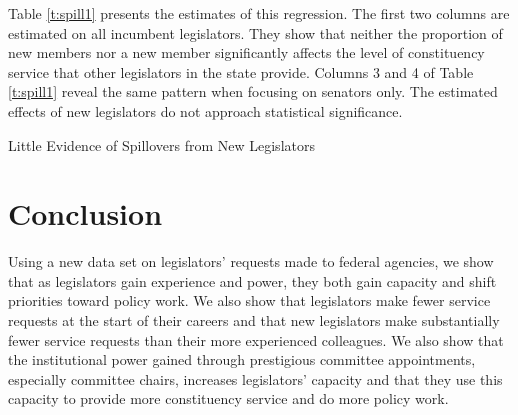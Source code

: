 \documentclass[12pt]{article}
\begin{document}
Table \ref{t:spill1} presents the estimates of this regression. The first two columns are estimated on all incumbent legislators. They show that neither the proportion of new members nor a new member significantly affects the level of constituency service that other legislators in the state provide. Columns 3 and 4 of Table \ref{t:spill1} reveal the same pattern when focusing on senators only. The estimated effects of new legislators do not approach statistical significance.  

   

\begin{table}[hbt!]
\caption{Little Evidence of Spillovers from New Legislators} \label{t:spill1}

\begin{minipage}{\textwidth}
\begin{center}

\end{center}
\end{minipage}
\end{table}


\section{Conclusion} \label{s:conclude}
Using a new data set on legislators' requests made to federal agencies, we show that as legislators gain experience and power, they both gain capacity and shift priorities toward policy work. We also show that legislators make fewer service requests at the start of their careers and that new legislators make substantially fewer service requests than their more experienced colleagues. We also show that the institutional power gained through prestigious committee appointments, especially committee chairs, increases legislators' capacity and that they use this capacity to provide more constituency service and do more policy work.

\end{document}
